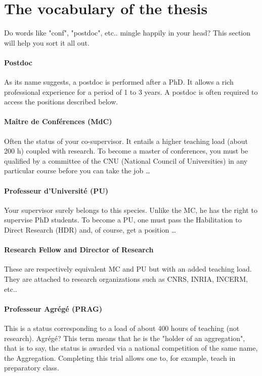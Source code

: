 \section{The vocabulary of the thesis}
Do words like "conf", "postdoc", etc.. mingle happily in your head?
This section will help you sort it all out.
\paragraph {Postdoc}
As its name suggests, a postdoc is performed after a PhD.
It allows a rich professional experience for a period of 1 to 3 years.
A postdoc is often required to access the positions described below.
\paragraph {Maître de Conférences (MdC)}
Often the status of your co-supervisor.
It entails a higher teaching load (about 200 h) coupled with research.
To become a master of conferences, you must be qualified by a committee of the CNU (National Council of Universities) in any particular course before you can take the job \dots
\paragraph{Professeur d'Université (PU)}
Your supervisor surely belongs to this species.
Unlike the MC, he has the right to supervise PhD students.
To become a PU, one must pass the Habilitation to Direct Research (HDR) and, of course, get a position \dots
\paragraph{Research Fellow and Director of Research}
These are respectively equivalent MC and PU but with an added teaching load.
They are attached to research organizations such as CNRS, INRIA, INCERM, etc..
\paragraph{Professeur Agrégé (PRAG)} This is a status corresponding to a load of about 400 hours of teaching (not research).
Agrégé? This term means that he is the "holder of an aggregation", that is to say, the status is awarded via a national competition of the same name, the Aggregation. Completing this trial allows one to, for example, teach in preparatory class.

